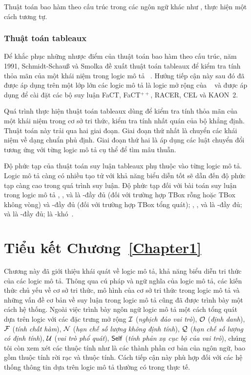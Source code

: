 Thuật toán bao hàm theo cấu trúc trong các ngôn ngữ khác như \FLbot, \ALN thực hiện một cách tương tự.

\subsubsection{Thuật toán tableaux}
\label{sec:Chap1.Tableaux}
Để khắc phục những nhược điểm của thuật toán bao hàm theo cấu trúc, năm 1991, Schmidt-Schau{\ss} và Smolka đề xuất thuật toán tableaux để kiểm tra tính thỏa mãn của một khái niệm trong logic mô tả \ALC~\cite{Schmidt1991}. Hướng tiếp cận này sau đó đã được áp dụng trên một lớp lớn các logic mô tả là logic mở rộng của \ALC~\cite{DLHandbook2007,Baader2001, Hollunder1990,Hollunder1991,Nguyen2011,Nguyen2011B,Nguyen2011C,Nguyen2013B} và được áp dụng để cài đặt các bộ suy luận FaCT, FaCT$^{++}$, RACER, CEL và KAON~2.

Quá trình thực hiện thuật toán tableaux dùng để kiểm tra tính thỏa mãn của một khái niệm trong cơ sở tri thức, kiểm tra tính nhất quán của bộ khẳng định. Thuật toán này trải qua hai giai đoạn. Giai đoạn thứ nhất là chuyển các khái niệm về dạng chuẩn phủ định. Giai đoạn thứ hai là áp dụng các luật chuyển đổi tương ứng với từng logic mô tả cụ thể để tìm mâu thuẫn.

Độ phức tạp của thuật toán suy luận tableaux phụ thuộc vào từng logic mô tả. Logic mô tả càng có nhiều tạo tử với khả năng biểu diễn tốt sẽ dẫn đến độ phức tạp càng cao trong quá trình suy luận. Độ phức tạp đối với bài toán suy luận trong logic mô tả \ALC, \ALCI, \ALCIQ và \LogicS là \PSPACE-đầy đủ (đối với trường hợp TBox rỗng hoặc TBox không vòng) và \EXPTIME-đầy đủ (đối với trường hợp TBox tổng quát); \SH, \SHI, \SHIN và \SHIQ là \EXPTIME-đầy đủ; \SHOIN và \SHOIQ là \NEXPTIME-đầy đủ; \SROIQ là \NEXPTIME-khó~\cite{Horrocks1999,Horrocks2000, Horrocks2006,Horrocks2007B,Nguyen2009,Nguyen2013,Nguyen2013B,Zolin2014}.

\section*{Tiểu kết Chương~\ref{Chapter1}}
\label{sec:Chap1.Summary}

Chương này đã giới thiệu khái quát về logic mô tả, khả năng biểu diễn tri thức của các logic mô tả. Thông qua cú pháp và ngữ nghĩa của logic mô tả, các kiến thức chủ yếu về cơ sở tri thức, mô hình của cơ sở tri thức trong logic mô tả và những vấn đề cơ bản về suy luận trong logic mô tả cũng đã được trình bày một cách hệ thống. Ngoài việc trình bày ngôn ngữ logic mô tả một cách tổng quát dựa trên logic \ALCreg với các đặc trưng mở rộng $\mathcal{I}$ ({\em nghịch đảo vai trò}), $\mathcal{O}$ ({\em định danh}), $\mathcal{F}$ ({\em tính chất hàm}), $\mathcal{N}$ ({\em hạn chế số lượng không định tính}), $\mathcal{Q}$ ({\em hạn chế số lượng có định tính}), $\mathcal{U}$ ({\em vai trò phổ quát}), $\mathsf{Self}$ ({\em tính phản xạ cục bộ của vai trò}), chúng tôi còn xem xét các thuộc tính như là các thành phần cơ bản của ngôn ngữ, bao gồm thuộc tính rời rạc và thuộc tính. Cách tiếp cận này phù hợp đối với các hệ thống thông tin dựa trên logic mô tả thường có trong thực tế.
\cleardoublepage
